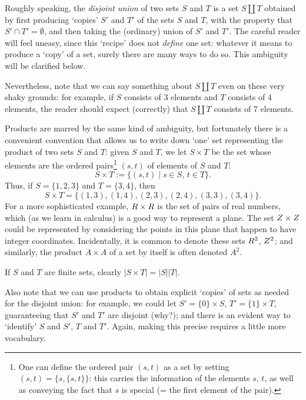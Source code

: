 Roughly speaking, the \emph{disjoint union} of two sets $S$ and $T$ is
a set $S \amalg T$ obtained by first producing `copies' $S'$ and $T'$
of the sets $S$ and $T$, with the property that
$S' \cap T' = \emptyset$, and then taking the (ordinary) union of $S'$
and $T'$. The careful reader will feel uneasy, since this `recipe'
does not \emph{define} one set: whatever it means to produce a `copy'
of a set, surely there are many ways to do so. This ambiguity will be
clarified below.

Nevertheless, note that we can say something about $S \amalg T$ even
on these very shaky grounds: for example, if $S$ consists of 3
elements and $T$ consists of 4 elements, the reader should expect
(correctly) that $S \amalg T$ consists of 7 elements.

Products are marred by the same kind of ambiguity, but fortunately
there is a convenient convention that allows us to write down `one'
set representing the product of two sets $S$ and $T$: given $S$ and
$T$, we let $S \times T$ be the set whose elements are the ordered
pairs\footnote{One can define the ordered pair $(s, t)$ as a set by
  setting $(s, t) = \{s, \{s, t\}\}$: this carries the information of
  the elements $s$, $t$, as well as conveying the fact that $s$ is
  special (= the first element of the pair).} $(s, t)$ of elements of
$S$ and $T$:
\[
  S \times T := \{(s, t) \mid s \in S,\, t \in T\}.
\]
Thus, if $S = \{1, 2, 3\}$ and $T = \{3, 4\}$, then
\[S \times T = \{(1, 3), (1, 4), (2, 3), (2, 4), (3, 3), (3, 4)\}.\]
For a more sophisticated example, $R \times R$ is the set of pairs
of real numbers, which (as we learn in calculus) is a good way to
represent a plane.  The set $Z \times Z$ could be represented by
considering the points in this plane that happen to have integer
coordinates. Incidentally, it is common to denote these sets $R^2$,
$Z^2$; and similarly, the product $A \times A$ of a set by itself is
often denoted $A^2$.

If $S$ and $T$ are finite sets, clearly $|S \times T| = |S||T|$.

Also note that we can use products to obtain explicit `copies' of sets
as needed for the disjoint union: for example, we could let
$S' = \{0\} \times S$, $T' = \{1\} \times T$, guaranteeing that $S'$
and $T'$ are disjoint (why?); and there is an evident way to
`identify' $S$ and $S'$, $T$ and $T'$. Again, making this precise
requires a little more vocabulary.

